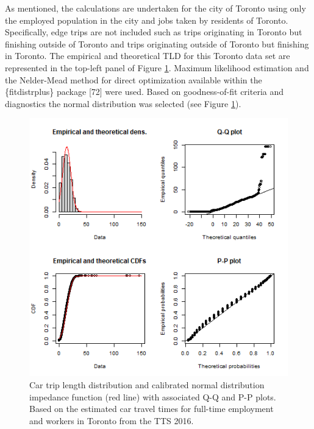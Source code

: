 \documentclass[10pt,letterpaper]{article}
\begin{document}
As mentioned, the calculations are undertaken for the city of Toronto
using only the employed population in the city and jobs taken by
residents of Toronto. Specifically, edge trips are not included such as
trips originating in Toronto but finishing outside of Toronto and trips
originating outside of Toronto but finishing in Toronto. The empirical
and theoretical TLD for this Toronto data set are represented in the
top-left panel of Figure \ref{fig:TLD-norm-plot}. Maximum likelihood
estimation and the Nelder-Mead method for direct optimization available
within the \{fitdistrplus\} package {[}72{]} were used. Based on
goodness-of-fit criteria and diagnostics the normal distribution was
selected (see Figure \ref{fig:TLD-norm-plot}).

\begin{figure}

{\centering \includegraphics[width=1\linewidth]{images/impedance_function} 

}

\caption{\label{fig:TLD-norm-plot}Car trip length distribution and calibrated normal distribution impedance function (red line) with associated Q-Q and P-P plots. Based on the estimated car travel times for full-time employment and workers in Toronto from the TTS 2016.}\label{fig:TLD-norm-plot}
\end{figure}
\end{document}
